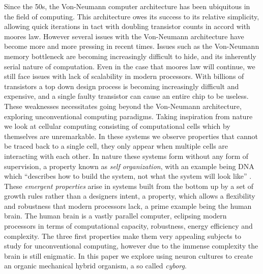 Since the 50s, the Von-Neumann computer architecture has been ubiquitous in the
field of computing. This architecture owes its success to its relative
simplicity, allowing quick iterations in tact with doubling transistor counts in
accord with moores law.
However several issues with the Von-Neumann architecture have become more and more
pressing in recent times. Issues such as the Von-Neumann memory bottleneck are
becoming increasingly difficult to hide, and its inherently serial nature of computation.
Even in the case that moores law will continue, we still face issues with lack
of scalability in modern processors.
With billions of transistors a top down
design process is becoming increasingly difficult and expensive, and a single
faulty transistor can cause an entire chip to be useless.
These weaknesses necessitates going beyond the Von-Neumann architecture,
exploring unconventional computing paradigms.
Taking inspiration from nature we
look at cellular computing consisting of computational cells which by themselves
are unremarkable.
In these systems we observe properties that cannot be
traced back to a single cell, they only appear when multiple cells are
interacting with each other.
In nature these systems form without any form of supervision, a property known
as \textit{self organization}, with an example being 
DNA which ``describes how to build the system, not what the system will look
like'' \cite{tufte_evo_2009}.
These \textit{emergent properties} arise in systems built from the bottom up by
%
a set of growth rules rather than a designers intent, a  property, which allows a flexibility and robustness that modern
processors lack, a prime example being the human brain.
%
The human brain is a vastly parallel computer, eclipsing modern processors in
terms of computational capacity, robustness, energy efficiency and complexity.
The three first properties make them very appealing subjects to study for
unconventional computing, however due to the immense complexity the brain is
still enigmatic.
In this paper we explore using neuron cultures to create an organic mechanical
hybrid organism, a so called \textit{cyborg}.

